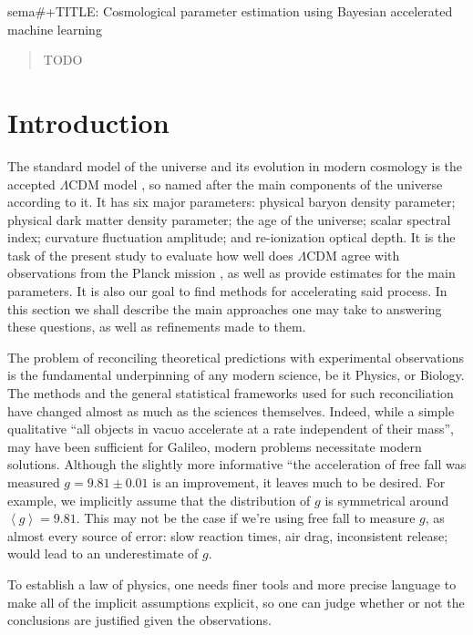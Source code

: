 \documentclass[usenatbib]{mnras}
\author{Aleksandr Petrosyan, William J. Handley}
\date{\today}
\title{}
\begin{document}
sema\#+TITLE: Cosmological parameter estimation using Bayesian accelerated machine learning

\begin{abstract}
TODO
\end{abstract}

\section{Introduction}
\label{sec:org9262df9}

The standard model of the universe and its evolution in modern
cosmology is the accepted \(\Lambda\)CDM model \citep{Condon2018},
so named after the main components of the universe according to
it. It has six major parameters: physical baryon density parameter;
physical dark matter density parameter; the age of the universe;
scalar spectral index; curvature fluctuation amplitude; and
re-ionization optical depth. It is the task of the present study to
evaluate how well does \(\Lambda\)CDM agree with observations from
the Planck mission \citep{planck}, as well as provide estimates for
the main parameters. It is also our goal to find methods for
accelerating said process. In this section we shall describe the
main approaches one may take to answering these questions, as well
as refinements made to them.

The problem of reconciling theoretical predictions with experimental
observations is the fundamental underpinning of any modern science,
be it Physics, or Biology. The methods and the general statistical
frameworks used for such reconciliation have changed almost as much
as the sciences themselves. Indeed, while a simple qualitative ``all
objects in vacuo accelerate at a rate independent of their mass'',
may have been sufficient for Galileo, modern problems necessitate
modern solutions. Although the slightly more informative ``the
acceleration of free fall was measured \(g = 9.81 \pm 0.01\) is an
improvement, it leaves much to be desired. For example, we
implicitly assume that the distribution of \(g\) is symmetrical
around \(\left \langle g \right \rangle = 9.81\). This may not be
the case if we're using free fall to measure \(g\), as almost every
source of error: slow reaction times, air drag, inconsistent
release; would lead to an underestimate of \(g\). 

To establish a law of physics, one needs finer tools and more
precise language to make all of the implicit assumptions explicit,
so one can judge whether or not the conclusions are justified given
the observations.
\end{document}
